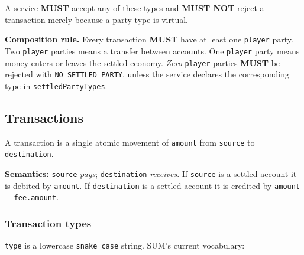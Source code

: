 \documentclass[11pt,a4paper]{article}
\newcommand{\code}[1]{\texttt{\small #1}}
\newcommand{\req}{\textbf{MUST}}
\newcommand{\keybox}[2]{%
  \par\vspace{0.5em}\noindent
  \colorbox{#1}{%
    \begin{minipage}{\dimexpr\linewidth-2\fboxsep\relax}
    \vspace{0.35em}\small #2\vspace{0.35em}
    \end{minipage}}%
  \par\vspace{0.5em}}
\newcommand{\note}[1]{\keybox{omceWash}{#1}}
\begin{document}
A service \req{} accept any of these types and \textbf{MUST NOT} reject a transaction merely
because a party type is virtual.

\note{\textbf{Composition rule.} Every transaction \req{} have at least one \code{player} party. Two
\code{player} parties means a transfer between accounts. One \code{player} party means money enters
or leaves the settled economy. \emph{Zero} \code{player} parties \req{} be rejected with
\code{NO\_SETTLED\_PARTY}, unless the service declares the corresponding type in
\code{settledPartyTypes}.}

\subsection{Transactions}
\label{sec:transactions}

A transaction is a single atomic movement of \code{amount} from \code{source} to
\code{destination}.

\textbf{Semantics:} \code{source} \emph{pays}; \code{destination} \emph{receives}. If \code{source}
is a settled account it is debited by \code{amount}. If \code{destination} is a settled account it
is credited by \code{amount} $-$ \code{fee.amount}.

\subsubsection*{Transaction types}

\code{type} is a lowercase \code{snake\_case} string. SUM's current vocabulary:
\end{document}
